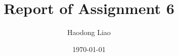 \documentclass[sigconf]{acmart}
\begin{document}
\title{Report of Assignment 6}

\author{Haodong Liao}
\date{\today}       %





\renewcommand{\shortauthors}{Haodong}



\end{document}

